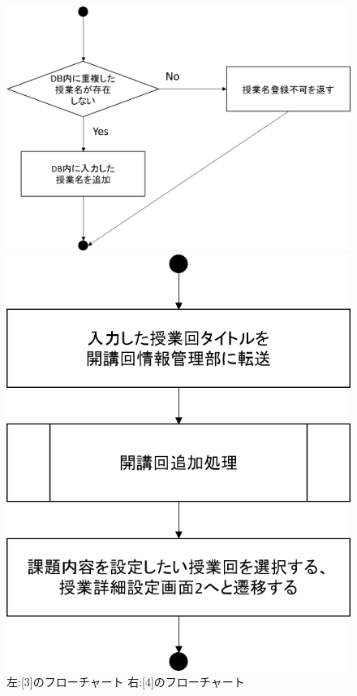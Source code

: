 \begin{figure}[htbp]
 \begin{minipage}{0.5\hsize}
  \begin{center}
   \includegraphics[width=1\linewidth,clip]{./img/create_lecture/sub3.png}
  \end{center}
 \end{minipage}
 \begin{minipage}{0.5\hsize}
  \begin{center}
   \includegraphics[width=0.5\linewidth,clip]{./img/create_lecture/sub4.png}
  \end{center}
 \end{minipage}
 \caption{左:[3]のフローチャート 右:[4]のフローチャート}\label{fig:createlectureflow1}
\end{figure}

